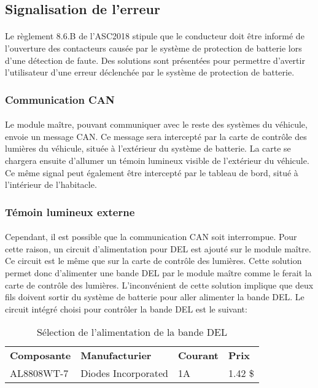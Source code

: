 
\subsection{Signalisation de l'erreur}

	\paragraph*{}
	Le règlement 8.6.B de l'ASC2018\cite{ASC2018} stipule que le conducteur doit être informé de l'ouverture des contacteurs causée par le système de protection de  batterie lors d'une détection de faute. Des solutions sont présentées pour permettre d'avertir l'utilisateur d'une erreur déclenchée par le système de protection de batterie.

	\subsubsection{Communication CAN}
		\paragraph*{}
		Le module maître, pouvant communiquer avec le reste des systèmes du véhicule, envoie un message CAN. Ce message sera intercepté par la carte de contrôle des lumières du véhicule, située à l'extérieur du système de batterie. La carte se chargera ensuite d'allumer un témoin lumineux visible de l'extérieur du véhicule. Ce même signal peut également être intercepté par le tableau de bord, situé à l'intérieur de l'habitacle.

	\subsubsection{Témoin lumineux externe}
		\paragraph*{}
		Cependant, il est possible que la communication CAN soit interrompue. Pour cette raison, un circuit d'alimentation pour DEL est ajouté sur le module maître. Ce circuit est le même que sur la carte de contrôle des lumières. Cette solution permet donc d'alimenter une bande DEL par le module maître comme le ferait la carte de contrôle des lumières. L'inconvénient de cette solution implique que deux fils doivent sortir du système de batterie pour aller alimenter la bande DEL. Le circuit intégré choisi pour contrôler la bande DEL est le suivant:

	\begin{table}[H]
		\centering
		\caption{Sélection de l'alimentation de la bande DEL}
		\label{LedDriver}
		\renewcommand{\arraystretch}{1.3}
		\begin{tabular}{|p{3cm}|p{4cm}|p{2cm}|p{1.5cm}|}
			\hline
			\textbf{Composante} & \textbf{Manufacturier} & \textbf{Courant} & \textbf{Prix}
			\\ \hhline{|=|=|=|=|}
			AL8808WT-7 & Diodes Incorporated  & 1A & 1.42 \$ \\ \hline
		\end{tabular}
	\end{table}

